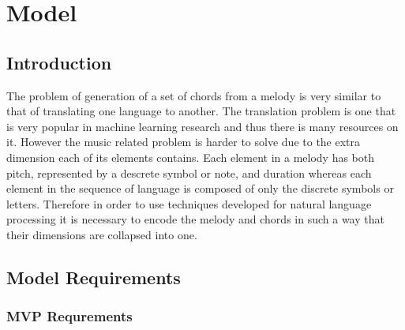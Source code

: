 
\chapter{Model} %

\label{Chapter4} %


\newcommand{\keyword}[1]{\textbf{#1}}
\newcommand{\tabhead}[1]{\textbf{#1}}
\newcommand{\code}[1]{\texttt{#1}}
\newcommand{\file}[1]{\texttt{\bfseries#1}}
\newcommand{\option}[1]{\texttt{\itshape#1}}



\section{Introduction}


The problem of generation of a set of chords from a melody is very similar to that of translating one language to another. 
The translation problem is one that is very popular in machine learning research and thus there is many resources on it.  
However the music related problem is harder to solve due to the extra dimension each of its elements contains. 
Each element in a melody has both pitch, represented by a descrete symbol or note, and duration whereas each element in the sequence of language is composed of only the discrete symbols or letters.  
Therefore in order to use techniques developed for natural language processing it is necessary to encode the melody and chords in such a way that their dimensions are collapsed into one. 


\section{Model Requirements}
\subsection{MVP Requrements}

